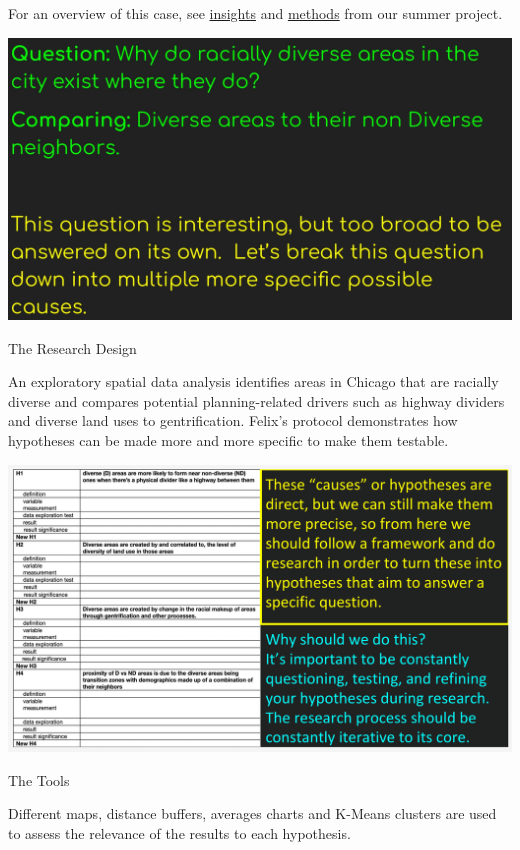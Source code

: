 \documentclass[
]{book}
\begin{document}
For an overview of this case, see \href{https://uchicago.box.com/s/pdku4e9rszvhtfnl1mv9o6sdv0ul1j3b}{insights} and \href{https://uchicago.box.com/s/rllzauyb3ew80htdq92i38o0re3q34v0}{methods} from our summer project.

\includegraphics{images/racialdiversity2.jpg}

The Research Design

An exploratory spatial data analysis identifies areas in Chicago that are racially diverse and compares potential planning-related drivers such as highway dividers and diverse land uses to gentrification. Felix's protocol demonstrates how hypotheses can be made more and more specific to make them testable.

\includegraphics{images/racialdiversity3.png}

The Tools

Different maps, distance buffers, averages charts and K-Means clusters are used to assess the relevance of the results to each hypothesis.
\end{document}
